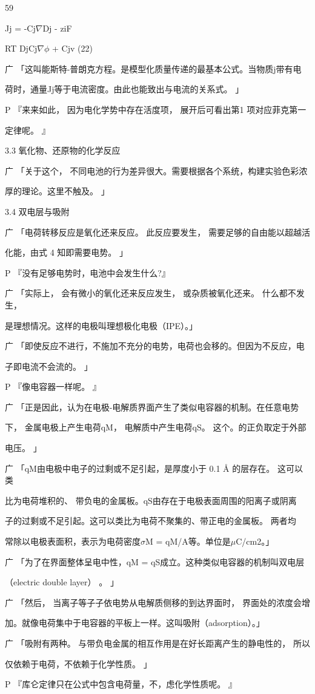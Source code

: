 59\par
Jj = -Cj$\nabla$Dj - ziF\par
RT DjCj$\nabla$$\phi$ + Cjv (22)\par
广 「这叫能斯特-普朗克方程。是模型化质量传递的最基本公式。当物质j带有电\par
荷时，通量Jj等于电流密度。由此也能致出与电流的关系式。 」\par
P 『来来如此， 因为电化学势中存在活度项， 展开后可看出第1 项对应菲克第一\par
定律呢。 』\par
3.3 氧化物、还原物的化学反应\par
广 「关于这个， 不同电池的行为差异很大。需要根据各个系统，构建实验色彩浓\par
厚的理论。这里不触及。 」\par
3.4 双电层与吸附\par
广 「电荷转移反应是氧化还来反应。 此反应要发生， 需要足够的自由能以超越活\par
化能，由式 4 知即需要电势。 」\par
P 『没有足够电势时，电池中会发生什么?』\par
广 「实际上， 会有微小的氧化还来反应发生， 或杂质被氧化还来。 什么都不发生，\par
是理想情况。这样的电极叫理想极化电极（IPE）。」\par
广 「即使反应不进行，不施加不充分的电势，电荷也会移的。但因为不反应，电\par
子即电流不会流的。 」\par
P 『像电容器一样呢。 』\par
广 「正是因此，认为在电极-电解质界面产生了类似电容器的机制。在任意电势\par
下， 金属电极上产生电荷qM， 电解质中产生电荷qS。 这个。的正负取定于外部\par
电压。 」\par
广 「qM由电极中电子的过剩或不足引起，是厚度小于 0.1 Å 的层存在。 这可以类\par
比为电荷堆积的、 带负电的金属板。qS由存在于电极表面周围的阳离子或阴离\par
子的过剩或不足引起。这可以类比为电荷不聚集的、带正电的金属板。 两者均\par
常除以电极表面积，表示为电荷密度$\sigma$M = qM/A等。单位是$\mu$C/cm2。」\par
广 「为了在界面整体呈电中性，qM = qS成立。这种类似电容器的机制叫双电层\par
（electric double layer） 。 」\par
广 「然后， 当离子等子子依电势从电解质侧移的到达界面时， 界面处的浓度会增\par
加。就像电荷集中于电容器的平板上一样。这叫吸附（adsorption）。」\par
广 「吸附有两种。 与带负电金属的相互作用是在好长距离产生的静电性的， 所以\par
仅依赖于电荷，不依赖于化学性质。 」\par
P 『库仑定律只在公式中包含电荷量，不，虑化学性质呢。 』\par

